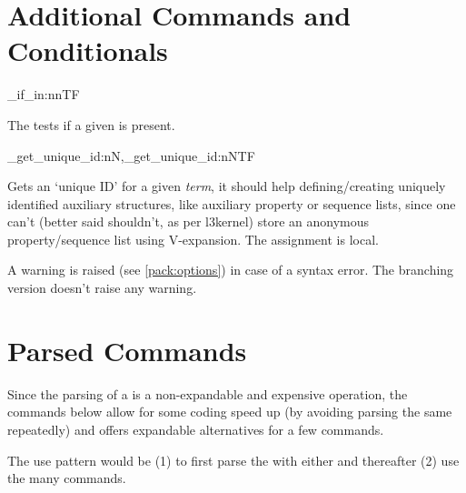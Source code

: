 \documentclass[10pt]{article}
\begin{document}
\section{Additional Commands and Conditionals}\label{conditionals:terms}

\begin{codedescribe}{\starray_if_in:nnTF}
\begin{codesyntax}%
\end{codesyntax}
The  tests if a given  is present.
\end{codedescribe}

\begin{codedescribe}[code,new=2024/03/10]{\starray_get_unique_id:nN,\starray_get_unique_id:nNTF}
\begin{codesyntax}%
\end{codesyntax}
Gets an `unique ID' for a given  \emph{term}, it should help defining/creating uniquely identified auxiliary structures, like auxiliary property or sequence lists, since one can't (better said shouldn't, as per l3kernel) store an anonymous property/sequence list using V-expansion.  The assignment is local.

\end{codedescribe}
\begin{tsremark}
A warning is raised (see \ref{pack:options}) in case of a  syntax error. The branching version doesn't raise any warning.
\end{tsremark}

\section{Parsed Commands}\label{pack:parsed}
Since the parsing of a  is a non-expandable and expensive operation, the commands below allow for some coding speed up (by avoiding parsing the same  repeatedly) and offers expandable alternatives for a few commands.

The use pattern would be (1) to first parse the  with either  and thereafter (2) use the many  commands. 
\end{document}
